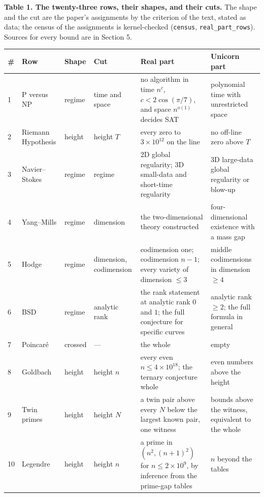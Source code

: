 \documentclass[10pt]{article}
\begin{document}
\begin{table}[!htbp]
\centering\scriptsize
\renewcommand{\arraystretch}{1.12}
\raggedright \textbf{Table 1. The twenty-three rows, their shapes, and their cuts.} The shape and the cut are the paper's assignments by the criterion of the text, stated as data; the census of the assignments is kernel-checked (\texttt{census}, \texttt{real\_part\_rows}). Sources for every bound are in Section 5.\par\smallskip
\begin{tabularx}{\textwidth}{@{}P{0.02\textwidth} P{0.13\textwidth} P{0.05\textwidth} P{0.10\textwidth} L L@{}}
\toprule
\textbf{\#} & \textbf{Row} & \textbf{Shape} & \textbf{Cut} & \textbf{Real part} & \textbf{Unicorn part} \\
 & P versus NP & regime & time and space & no algorithm in time $n^{c}$, $c < 2\cos(\pi/7)$, and space $n^{o(1)}$ decides SAT & polynomial time with unrestricted space \\
2 & Riemann Hypothesis & height & height $T$ & every zero to $3 \times 10^{12}$ on the line & no off-line zero above $T$ \\
3 & Navier--Stokes & regime & regime & 2D global regularity; 3D small-data and short-time regularity & 3D large-data global regularity or blow-up \\
4 & Yang--Mills & regime & dimension & the two-dimensional theory constructed & four-dimensional existence with a mass gap \\
5 & Hodge & regime & dimension, codimension & codimension one; codimension $n-1$; every variety of dimension $\le 3$ & middle codimensions in dimension $\ge 4$ \\
6 & BSD & regime & analytic rank & the rank statement at analytic rank $0$ and $1$; the full conjecture for specific curves & analytic rank $\ge 2$; the full formula in general \\
7 & Poincaré & crossed & --- & the whole & empty \\
8 & Goldbach & height & height $n$ & every even $n \le 4 \times 10^{18}$; the ternary conjecture whole & even numbers above the height \\
9 & Twin primes & height & height $N$ & a twin pair above every $N$ below the largest known pair, one witness & bounds above the witness, equivalent to the whole \\
10 & Legendre & height & height $n$ & a prime in $(n^2, (n+1)^2)$ for $n \le 2 \times 10^9$, by inference from the prime-gap tables & $n$ beyond the tables \\

\end{tabularx}
\end{table}
\end{document}

